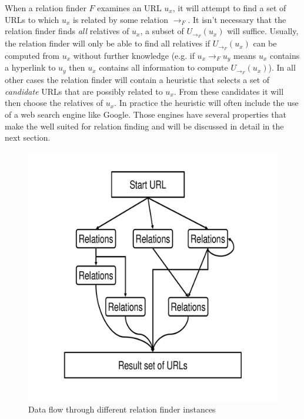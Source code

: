 \documentclass[a4paper]{danarticle}
\theoremstyle{remark}
\begin{document}
       When a relation finder $ F $ examines an URL $ u_x $, it will attempt to 
       find a set of URLs to which $ u_x $ is related by some relation 
       $ \rightarrow_F $. It isn't necessary that the relation finder finds 
       \emph{all} relatives of $ u_x $, a subset of $ U_{\rightarrow_F}(u_x) $ 
       will suffice. Usually, the relation finder will only be able to find 
       all relatives if $ U_{\rightarrow_F}(u_x) $ can be computed from $ u_x $ 
       without further knowledge (e.g. if $ u_x \rightarrow_F u_y $ means 
       $ u_x $ contains a hyperlink to $ u_y $ then $ u_x $ contains all 
       information to compute $ U_{\rightarrow_F}(u_x) $). In all other cases the 
       relation finder will contain a heuristic that selects a set of 
       \textit{candidate} URLs that are possibly related to $ u_x $. From these 
       candidates it will then choose the relatives of $ u_x $. In practice the 
       heuristic will often include the use of a web search engine like 
       Google\cite{google}. Those engines have several properties that make the well 
       suited for relation finding and will be discussed in detail in the next 
       section.
       
       \begin{figure}[ht]
         \centering
	     \includegraphics[width=12cm]{relations}
	     \caption{Data flow through different relation finder instances}
	     \label{relations}
       \end{figure}
       
\end{document}
